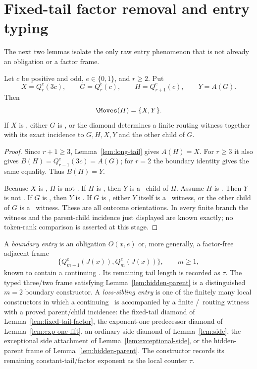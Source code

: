 \section{Fixed-tail factor removal and entry typing}

The next two lemmas isolate the only raw entry phenomenon that is not already
an obligation or a factor frame.

\begin{lemma}\label{lem:fixed-tail-factor}
Let $c$ be positive and odd, $e\in\{0,1\}$, and $r\ge2$. Put
\[
  X=Q_r^e(3c),\qquad G=Q_r^e(c),\qquad H=Q_{r+1}^e(c),\qquad Y=A(G).
\]
Then
\[
  \Moves(H)=\{X,Y\}.
\]
If $X$ is \DRAW, either $G$ is \DRAW, or the diamond determines a finite
routing witness together with its exact incidence to $G,H,X,Y$ and the other
child of $G$.
\end{lemma}

\begin{proof}
Since $r+1\ge3$, Lemma~\ref{lem:long-tail} gives $A(H)=X$. For $r\ge3$ it
also gives $B(H)=Q_{r-1}^e(3c)=A(G)$; for $r=2$ the boundary identity gives
the same equality. Thus $B(H)=Y$.

Because $X$ is \DRAW, $H$ is not \LOSS. If $H$ is \WIN, then $Y$ is a
\LOSS\ child of $H$. Assume $H$ is \DRAW. Then $Y$ is not \LOSS. If $G$ is
\LOSS, then $Y$ is \WIN. If $G$ is \WIN, either $Y$ itself is a \LOSS\
witness, or the other child of $G$ is a \LOSS\ witness. These are all outcome
orientations. In every finite branch the witness and the parent-child
incidence just displayed are known exactly; no token-rank comparison is
asserted at this stage.
\end{proof}

\begin{definition}[Entry controls]\label{def:entry-controls}
A \emph{boundary entry} is an obligation $O(x,e)$ or, more generally, a
factor-free adjacent frame
\[
 \{Q_{m+1}^e(J(x)),Q_m^e(J(x))\},\qquad m\ge1,
\]
known to contain a continuing \DRAW. Its remaining tail length is recorded as
$\tau$. The typed three/two frame satisfying Lemma~\ref{lem:hidden-parent} is
a distinguished $m=2$ boundary constructor.
A \emph{loss-sibling entry} is one of the finitely many local constructors
in which a continuing \DRAW\ is accompanied by a finite \WIN/\LOSS\ routing
witness with a proved parent/child incidence: the fixed-tail diamond of Lemma~\ref{lem:fixed-tail-factor}, the exponent-one predecessor diamond of Lemma~\ref{lem:exp-one-lift}, an ordinary side diamond of Lemma~\ref{lem:side}, the exceptional side attachment of Lemma~\ref{lem:exceptional-side}, or the hidden-parent frame of Lemma~\ref{lem:hidden-parent}. The constructor records its remaining
constant-tail/factor exponent as the local counter $\tau$.
\end{definition}


